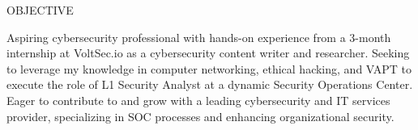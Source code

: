 \documentclass{resume} %
\begin{document}
\begin{rSection}{OBJECTIVE}

{Aspiring cybersecurity professional with hands-on experience from a 3-month internship at VoltSec.io as a cybersecurity content writer and researcher. Seeking to leverage my knowledge in computer networking, ethical hacking, and VAPT to execute the role of L1 Security Analyst at a dynamic Security Operations Center. Eager to contribute to and grow with a leading cybersecurity and IT services provider, specializing in SOC processes and enhancing organizational security.}

\end{rSection}
\end{document}
